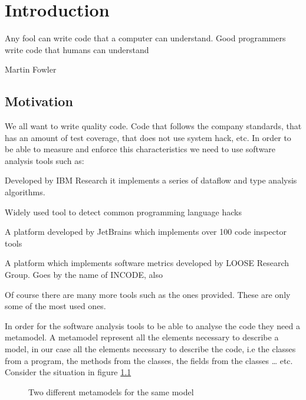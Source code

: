 \chapter{Introduction}\label{ch:1}

\epigraph{Any fool can write code that a computer can understand. Good
programmers write code that humans can understand}{Martin Fowler}

\section{Motivation}
	We all want to write quality code. Code that follows the company standards,
that has an amount of test coverage, that does not use system hack, etc. In
order to be able to measure and enforce this characteristics we need to use software
analysis tools such as:
	\begin{description}[labelindent=2cm]
	\item[Wala Tool]  Developed by IBM Research it implements a series of dataflow
and type analysis algorithms.
	\item[FindBugs]   Widely used tool to detect common programming language hacks
	\item[Intellij IDE] {A platform developed by JetBrains which implements over
100 code inspector tools}
	\item[CodePro]   A platform which implements software metrics developed by
LOOSE Research Group. Goes by the name of INCODE, also \cite{tools:inCode}
	\end{description}

	Of course there are many more tools such as the ones provided. These are only
some of the most used ones.
	
	In order for the software analysis tools to be able to analyse the code they
need a metamodel. A metamodel represent all the elements necessary to describe a
model, in our case all the elements necessary to describe the code, i.e the
classes from a program, the methods from the classes, the fields from the
classes \ldots{} etc.
	Consider the situation in figure \ref{fig:metamodels}

\begin{figure}
\centering
{}
\caption{Two different metamodels for the same model}
\label{fig:metamodels}
\end{figure}	
	

